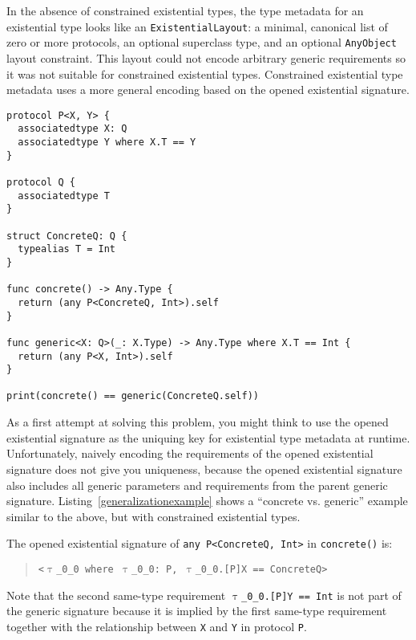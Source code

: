 \documentclass[a4paper,headsepline,bibliography=totoc,toc=flat,fleqn,twoside=semi]{scrbook}
\theoremstyle{definition}
\theoremstyle{definition}
\theoremstyle{definition}
\newcommand{\ttgp}[2]{\texttt{$\uptau$\_#1\_#2}}
\begin{document}
In the absence of constrained existential types, the type metadata for an existential type looks like an \texttt{ExistentialLayout}: a minimal, canonical list of zero or more protocols, an optional superclass type, and an optional \texttt{AnyObject} layout constraint. This layout could not encode arbitrary generic requirements so it was not suitable for constrained existential types. Constrained existential type metadata uses a more general encoding based on the opened existential signature.

\begin{listing}\label{generalizationexample}
\begin{Verbatim}
protocol P<X, Y> {
  associatedtype X: Q
  associatedtype Y where X.T == Y
}

protocol Q {
  associatedtype T
}

struct ConcreteQ: Q {
  typealias T = Int
}

func concrete() -> Any.Type {
  return (any P<ConcreteQ, Int>).self
}

func generic<X: Q>(_: X.Type) -> Any.Type where X.T == Int {
  return (any P<X, Int>).self
}

print(concrete() == generic(ConcreteQ.self))
\end{Verbatim}
\end{listing}

As a first attempt at solving this problem, you might think to use the opened existential signature as the uniquing key for existential type metadata at runtime. Unfortunately, naively encoding the requirements of the opened existential signature does not give you uniqueness, because the opened existential signature also includes all generic parameters and requirements from the parent generic signature. Listing~\ref{generalizationexample} shows a ``concrete vs. generic'' example similar to the above, but with constrained existential types.

The opened existential signature of \texttt{any P<ConcreteQ, Int>} in \texttt{concrete()} is:
\begin{quote}
\texttt{<\ttgp{0}{0} where \ttgp{0}{0}:\ P, \ttgp{0}{0}.[P]X == ConcreteQ>}
\end{quote}
Note that the second same-type requirement \texttt{\ttgp{0}{0}.[P]Y == Int} is not part of the generic signature because it is implied by the first same-type requirement together with the relationship between \texttt{X} and \texttt{Y} in protocol \texttt{P}.
\end{document}
